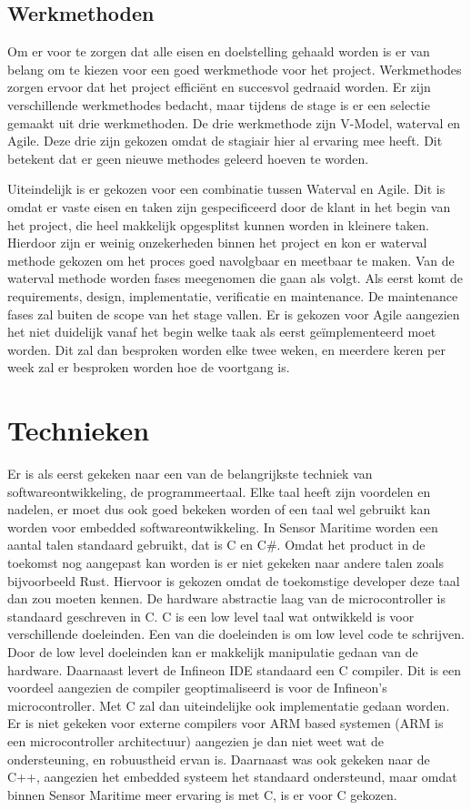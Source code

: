 \subsection{Werkmethoden}
Om er voor te zorgen dat alle eisen en doelstelling gehaald worden is er van belang om te kiezen voor een goed werkmethode voor het project. Werkmethodes zorgen ervoor dat het project efficiënt en succesvol gedraaid worden. Er zijn verschillende werkmethodes bedacht, maar tijdens de stage is er een selectie gemaakt uit drie werkmethoden. De drie werkmethode zijn V-Model, waterval en Agile. Deze drie zijn gekozen omdat de stagiair hier al ervaring mee heeft. Dit betekent dat er geen nieuwe methodes geleerd hoeven te worden. \newline

\noindent Uiteindelijk is er gekozen voor een combinatie tussen Waterval en Agile. Dit is omdat er vaste eisen en taken zijn gespecificeerd door de klant in het begin van het project, die heel makkelijk opgesplitst kunnen worden in kleinere taken. Hierdoor zijn er weinig onzekerheden binnen het project en kon er waterval methode gekozen om het proces goed navolgbaar en meetbaar te maken. Van de waterval methode worden fases meegenomen die gaan als volgt. Als eerst komt de requirements, design, implementatie, verificatie en maintenance. De maintenance fases zal buiten de scope van het stage vallen. Er is gekozen voor Agile aangezien het niet duidelijk vanaf het begin welke taak als eerst geïmplementeerd moet worden. Dit zal dan besproken worden elke twee weken, en meerdere keren per week zal er besproken worden hoe de voortgang is.




\section{Technieken}
Er is als eerst gekeken naar een van de belangrijkste techniek van softwareontwikkeling, de programmeertaal. Elke taal heeft zijn voordelen en nadelen, er moet dus ook goed bekeken worden of een taal wel gebruikt kan worden voor embedded softwareontwikkeling. In Sensor Maritime worden een aantal talen standaard gebruikt, dat is C en C\#. Omdat het product in de toekomst nog aangepast kan worden is er niet gekeken naar andere talen zoals bijvoorbeeld Rust. Hiervoor is gekozen omdat de toekomstige developer deze taal dan zou moeten kennen. De hardware abstractie laag van de microcontroller is standaard geschreven in C. C is een low level taal wat ontwikkeld is voor verschillende doeleinden. Een van die doeleinden is om low level code te schrijven. Door de low level doeleinden kan er makkelijk manipulatie gedaan van de hardware. Daarnaast levert de Infineon IDE standaard een C compiler. Dit is een voordeel aangezien de compiler geoptimaliseerd is voor de Infineon's microcontroller. Met C zal dan uiteindelijke ook implementatie gedaan worden. Er is niet gekeken voor externe compilers voor ARM based systemen (ARM is een microcontroller architectuur) aangezien je dan niet weet wat de ondersteuning, en robuustheid ervan is. Daarnaast was ook gekeken naar de C++, aangezien het embedded systeem het standaard ondersteund, maar omdat binnen Sensor Maritime meer ervaring is met C, is er voor C gekozen. 

